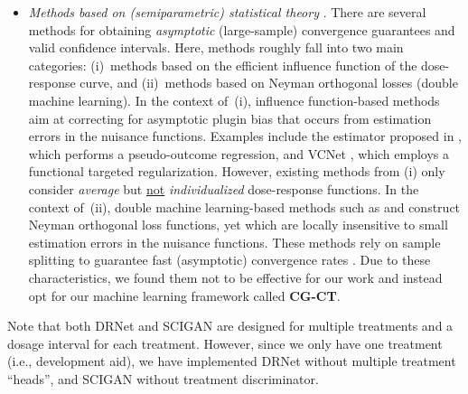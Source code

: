 \documentclass[sigconf]{acmart}
\newcommand{\framework}{\textbf{\mbox{CG-CT}}\xspace}
\begin{document}
\begin{itemize}
\item \emph{Methods based on (semiparametric) statistical theory} \cite{Kennedy.2017, Foster.2019, Colangelo.2020, Nie.2021}. There are several methods for obtaining \emph{asymptotic} (large-sample) convergence guarantees and valid confidence intervals. Here, methods roughly fall into two main categories: (i)~methods based on the efficient influence function of the dose-response curve, and (ii)~methods based on Neyman orthogonal losses (double machine learning). In the context of~(i), influence function-based methods aim at correcting for asymptotic plugin bias that occurs from estimation errors in the nuisance functions. Examples include the estimator proposed in \cite{Kennedy.2017}, which performs a pseudo-outcome regression, and VCNet \cite{Nie.2021}, which employs a functional targeted regularization. However, existing methods from (i) only consider \emph{average} but \underline{not} \emph{individualized} dose-response functions. In the context of~(ii), double machine learning-based methods such as \cite{Foster.2019} and \cite{Colangelo.2020} construct Neyman orthogonal loss functions, yet which are locally insensitive to small estimation errors in the nuisance functions. These methods rely on sample splitting to guarantee fast (asymptotic) convergence rates \cite{Chernozhukov.2018}. Due to these characteristics, we found them not to be effective for our work and instead opt for our machine learning framework called \framework.  
\end{itemize}
Note that both DRNet and SCIGAN are designed for multiple treatments and a dosage interval for each treatment. However, since we only have one treatment (i.e., development aid), we have implemented DRNet without multiple treatment ``heads'', and SCIGAN without treatment discriminator. 
\end{document}
